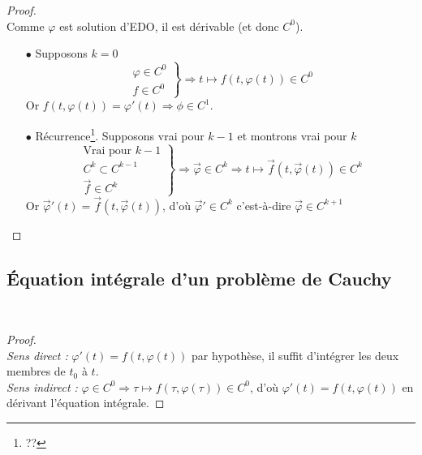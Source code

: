 	\begin{proof}\ \\
	Comme $\varphi$ est solution d'EDO, il est dérivable (et donc $C^0$).\\
	\begin{itemize}
	\item[$\bullet$] Supposons $k=0$
	\begin{equation}
	\left.\begin{array}{l}
	\varphi \in C^0\\
	f \in C^0
	\end{array}\right\} \Rightarrow t \mapsto f(t,\varphi(t)) \in C^0
	\end{equation}
	Or $f(t, \varphi(t)) = \varphi'(t) \Rightarrow \phi \in C^1$.
	
	\item[$\bullet$] Récurrence\footnote{??}. Supposons vrai pour $k-1$ et montrons vrai pour $k$
	\begin{equation}
	\left.\begin{array}{l}
	\text{Vrai pour } k-1\\
	C^k \subset C^{k-1}\\
	\vec f \in C^k
	\end{array}\right\} \Rightarrow \vec \varphi \in C^k \Rightarrow 
	t \mapsto \vec f(t,\vec \varphi(t)) \in C^k
	\end{equation}
	Or $\vec \varphi'(t) = \vec{f}(t,\vec{\varphi}(t))$, d'où $\vec \varphi' 
	\in C^k$ c'est-à-dire $\vec{\varphi}\in C^{k+1}$
	\end{itemize}
	\end{proof}
	
	
	\subsection{Équation intégrale d'un problème de Cauchy}
	\	
	\begin{proof}\ \\
	\textit{Sens direct : } $\varphi'(t) = f(t,\varphi(t))$ par hypothèse, il 
	suffit d'intégrer les deux membres de $t_0$ à $t$.\\
	
	\textit{Sens indirect :}  $\varphi \in C^0 \Longrightarrow \tau \mapsto f(
	\tau,\varphi(\tau)) \in C^0$, d'où $\varphi'(t) = f(t, \varphi(t))$ en dérivant
	l'équation intégrale.
	\end{proof}
	
